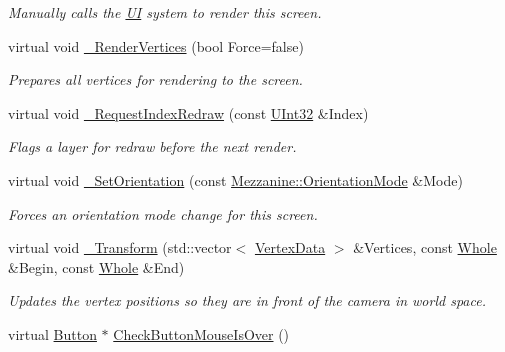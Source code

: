 \begin{DoxyCompactItemize}
\begin{DoxyCompactList}\small\item\em Manually calls the \hyperlink{namespaceMezzanine_1_1UI}{UI} system to render this screen. \item\end{DoxyCompactList}\item 
virtual void \hyperlink{classMezzanine_1_1UI_1_1Screen_a80ed9d29431e152d7d1ab6d7568d2033}{\_\-RenderVertices} (bool Force=false)
\begin{DoxyCompactList}\small\item\em Prepares all vertices for rendering to the screen. \item\end{DoxyCompactList}\item 
virtual void \hyperlink{classMezzanine_1_1UI_1_1Screen_ac33d1f47594d63413a41f254756e961c}{\_\-RequestIndexRedraw} (const \hyperlink{namespaceMezzanine_abea3b8e8e9b03d2547b2800284ba682d}{UInt32} \&Index)
\begin{DoxyCompactList}\small\item\em Flags a layer for redraw before the next render. \item\end{DoxyCompactList}\item 
virtual void \hyperlink{classMezzanine_1_1UI_1_1Screen_a48a51680bf92223a2820215bc408012d}{\_\-SetOrientation} (const \hyperlink{namespaceMezzanine_a8892173bd6aaf7d0e34a07b2b30aad33}{Mezzanine::OrientationMode} \&Mode)
\begin{DoxyCompactList}\small\item\em Forces an orientation mode change for this screen. \item\end{DoxyCompactList}\item 
virtual void \hyperlink{classMezzanine_1_1UI_1_1Screen_a3087b47a2098d51ebff5498616a3b8cf}{\_\-Transform} (std::vector$<$ \hyperlink{structMezzanine_1_1UI_1_1VertexData}{VertexData} $>$ \&Vertices, const \hyperlink{namespaceMezzanine_adcbb6ce6d1eb4379d109e51171e2e493}{Whole} \&Begin, const \hyperlink{namespaceMezzanine_adcbb6ce6d1eb4379d109e51171e2e493}{Whole} \&End)
\begin{DoxyCompactList}\small\item\em Updates the vertex positions so they are in front of the camera in world space. \item\end{DoxyCompactList}\item 
virtual \hyperlink{classMezzanine_1_1UI_1_1Button}{Button} $\ast$ \hyperlink{classMezzanine_1_1UI_1_1Screen_a55bf51bc4923effdd180ee945a4a0aa7}{CheckButtonMouseIsOver} ()

\end{DoxyCompactItemize}
